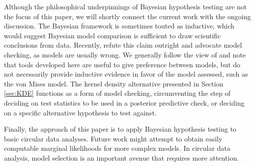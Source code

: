 Although the philosophical underpinnings of Bayesian hypothesis testing are not the focus of this paper, we will shortly connect the current work with the ongoing discussion. The Bayesian framework is sometimes touted as inductive, which would suggest Bayesian model comparison is sufficient to draw scientific conclusions from data. Recently, \citet{gelman2013philosophy} refute this claim outright and advocate model checking, as models are usually wrong. We generally follow the view of \citet{morey2013humble} and note that tools developed here are useful to give preference between models, but do not necessarily provide inductive evidence in favor of the model assessed, such as the von Mises model. The kernel density alternative presented in Section \ref{sec:KDE} functions as a form of model checking, circumventing the step of deciding on test statistics to be used in a posterior predictive check, or deciding on a specific alternative hypothesis to test against.

Finally, the approach of this paper is to apply Bayesian hypothesis testing to basic circular data analyses. Future work might attempt to obtain easily computable marginal likelihoods for more complex models. In circular data analysis, model selection is an important avenue that requires more attention. 

